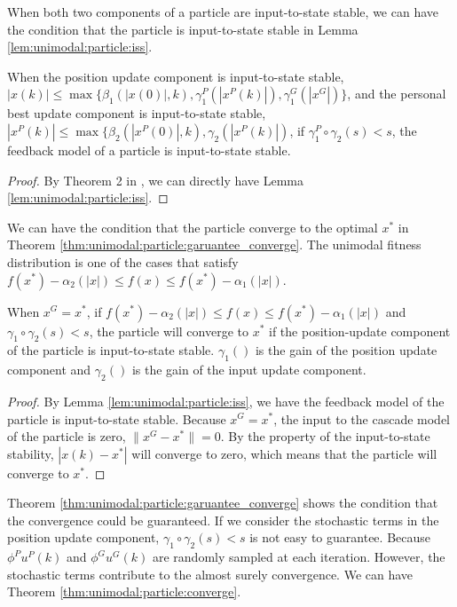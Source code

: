 When both two components of a particle are input-to-state stable, we can have the condition that the particle is input-to-state stable in Lemma \ref{lem:unimodal:particle:iss}.

\begin{mylem}
\label{lem:unimodal:particle:iss}
When the position update component is input-to-state stable,
$ | x (k) | \leq \max \{ \beta_{1} (| x(0) |, k ), \gamma^{P}_{1} ( | x^{P} (k) | ), \gamma^{G}_{1} ( | x^{G} | ) \} $,
and the personal best update component is input-to-state stable,
$ | x^{P} (k) | \leq \max \{ \beta_{2} (| x^{P}(0) |, k ), \gamma_{2} ( | x^{P} (k) | ) $,
if $ \gamma^{P}_{1} \circ \gamma_{2} (s)  < s $, the feedback model of a particle is input-to-state stable.
\begin{proof}
By Theorem 2 in \cite{Jiang2001857}, we can directly have Lemma \ref{lem:unimodal:particle:iss}.
\end{proof}
\end{mylem}

We can have the condition that the particle converge to the optimal $ x^{*} $ in Theorem \ref{thm:unimodal:particle:garuantee_converge}.
The unimodal fitness distribution is one of the cases that satisfy $ f(x^{*}) - \alpha_{2} ( |x| ) \leq  f(x) \leq f(x^{*}) - \alpha_{1} ( |x| ) $.

\begin{mythm}
\label{thm:unimodal:particle:garuantee_converge}
When $ x^{G} = x^{*} $,  if $ f(x^{*}) - \alpha_{2} ( |x| ) \leq  f(x) \leq f(x^{*}) - \alpha_{1} ( |x| ) $ and $ \gamma_{1} \circ \gamma_{2} (s)  < s $, the particle will converge to $ x^{*} $ if the position-update component of the particle is input-to-state stable.
$ \gamma_{1} () $ is the gain of the position update component and $ \gamma_{2} () $ is the gain of the input update component.
\begin{proof}
By Lemma \ref{lem:unimodal:particle:iss}, we have the feedback model of the particle is input-to-state stable.
Because $ x^{G} = x^{*} $, the input to the cascade model of the particle is zero, $ \lVert x^{G} - x^{*} \rVert = 0 $.
By the property of the input-to-state stability, $ | x(k) - x^{*} | $ will converge to zero, which means that the particle will converge to $ x^{*} $.
\end{proof}
\end{mythm}

Theorem \ref{thm:unimodal:particle:garuantee_converge} shows the condition that the convergence could be guaranteed.
If we consider the stochastic terms in the position update component, $ \gamma_{1} \circ \gamma_{2} (s)  < s $ is not easy to guarantee.
Because $ \phi^{P} u^{P} (k) $ and $  \phi^{G} u^{G} (k)  $ are randomly sampled at each iteration.
However, the stochastic terms contribute to the almost surely convergence.
We can have Theorem \ref{thm:unimodal:particle:converge}.

